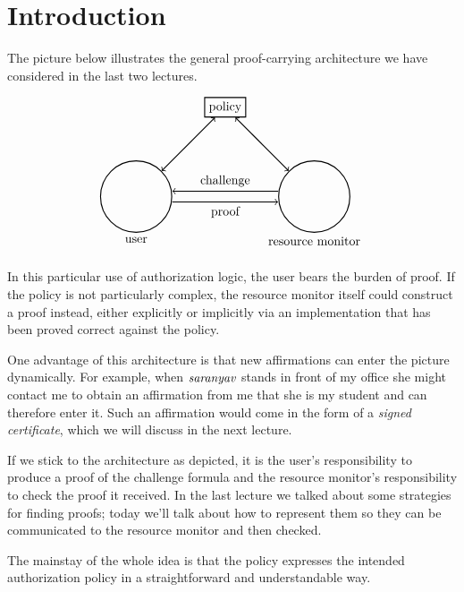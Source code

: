 \documentclass[11pt]{article}
\begin{document}
\maketitle

\section{Introduction}

The picture below illustrates the general proof-carrying architecture we have
considered in the last two lectures.

\[
\begin{tikzpicture}
  \node (user) at (0,0) [draw,thick,circle,radius=5,label=below:user] {\hspace*{5em}};
  \node (monitor) at (5,0) [draw,thick,circle,radius=5,label=below:resource monitor] {\hspace*{5em}};
  \node (policy) at (2.5,2.5) [draw,thick,rectangle] {policy};
  \draw [<->,thick] (user) -- (policy);
  \draw [<->,thick] (monitor) -- (policy);
  \draw [->,thick] ([yshift=1ex]monitor.west) -- ([yshift=1ex]user.east) node[midway,above] {challenge};
  \draw [->,thick] ([yshift=-1ex]user.east) -- ([yshift=-1ex]monitor.west) node[midway,below] {proof};
\end{tikzpicture}
\]

In this particular use of authorization logic, the user bears the burden of
proof.  If the policy is not particularly complex, the resource monitor itself
could construct a proof instead, either explicitly or implicitly via an
implementation that has been proved correct against the policy.

One advantage of this architecture is that new affirmations can enter the
picture dynamically.  For example, when $\mathit{saranyav}$ stands in front of my office
she might contact me to obtain an affirmation from me that she is my student and
can therefore enter it.  Such an affirmation would come in the form of a
\emph{signed certificate}, which we will discuss in the next lecture.

If we stick to the architecture as depicted, it is the user's responsibility to
produce a proof of the challenge formula and the resource monitor's
responsibility to check the proof it received.  In the last lecture we talked
about some strategies for finding proofs; today we'll talk about how to
represent them so they can be communicated to the resource monitor and then
checked.

The mainstay of the whole idea is that the policy expresses the intended
authorization policy in a straightforward and understandable way.
\end{document}
